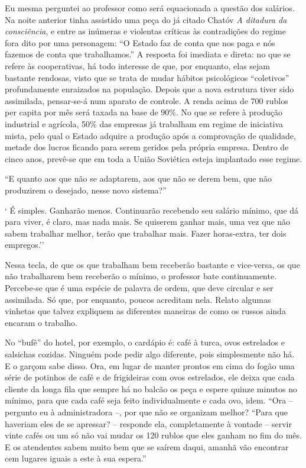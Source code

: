 Eu mesma perguntei ao professor como será equacionada a questão dos
salários. Na noite anterior tinha assistido uma peça do já citado Chatóv
\emph{A ditadura da consciência}, e entre as inúmeras e violentas
críticas às contradições do regime fora dito por uma personagem: ``O
Estado faz de conta que nos paga e nós fazemos de conta que
trabalhamos.'' A resposta foi imediata e direta: no que se refere às
cooperativas, há todo interesse de que, por enquanto, elas sejam
bastante rendosas, visto que se trata de mudar hábitos psicológicos
``coletivos'' profundamente enraizados na população. Depois que a nova
estrutura tiver sido assimilada, pensar-se-á num aparato de controle. A
renda acima de 700 rublos per capita por mês será taxada na base de
90\%. No que se refere à produção industrial e agrícola, 50\% das
empresas já trabalham em regime de iniciativa mista, pelo qual o Estado
adquire a produção após a comprovação de qualidade, metade dos lucros
ficando para serem geridos pela própria empresa. Dentro de cinco anos,
prevê-se que em toda a União Soviética esteja implantado esse regime.

``E quanto aos que não se adaptarem, aos que não se derem bem, que não
produzirem o desejado, nesse novo sistema?''

` É simples. Ganharão menos. Continuarão recebendo seu salário mínimo,
que dá para viver, é claro, mas nada mais. Se quiserem ganhar mais, uma
vez que não sabem trabalhar melhor, terão que trabalhar mais. Fazer
horas-extra, ter dois empregos.''

Nessa tecla, de que os que trabalham bem receberão bastante e
vice-versa, os que não trabalharem bem receberão o mínimo, o professor
bate continuamente. Percebe-se que é uma espécie de palavra de ordem,
que deve circular e ser assimilada. Só que, por enquanto, poucos
acreditam nela. Relato algumas vinhetas que talvez expliquem as
diferentes maneiras de como os russos ainda encaram o trabalho.

No ``bufê'' do hotel, por exemplo, o cardápio é: café à turca, ovos
estrelados e salsichas cozidas. Ninguém pode pedir algo diferente, pois
simplesmente não há. E o garçom sabe disso. Ora, em lugar de manter
prontos em cima do fogão uma série de potinhos de café e de frigideiras
com ovos estrelados, ele deixa que cada cliente da longa fila que sempre
há no balcão os peça e espere quinze minutos no mínimo, para que cada
café seja feito individualmente e cada ovo, idem. ``Ora -- pergunto eu à
administradora --, por que não se organizam melhor? ``Para que haveriam
eles de se apressar? -- responde ela, completamente à vontade -- servir
vinte cafés ou um só não vai mudar os 120 rublos que eles ganham no fim
do mês. E os atendentes sabem muito bem que se saírem daqui, amanhã vão
encontrar cem lugares iguais a este à sua espera.''

